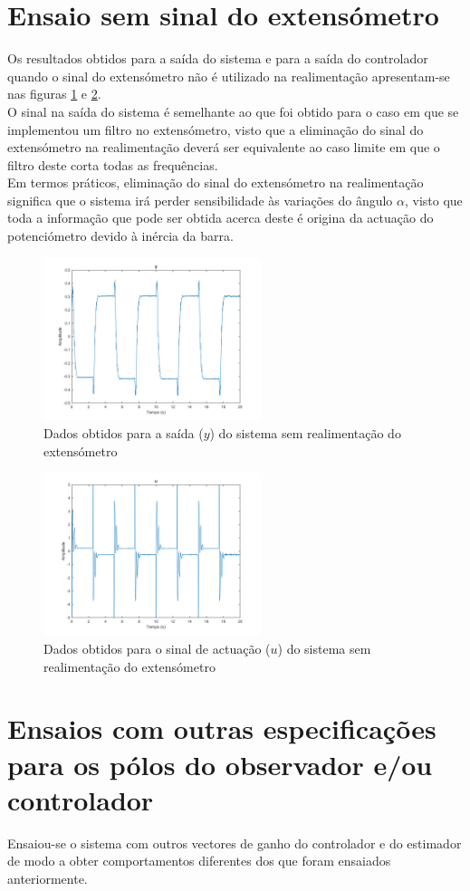 \documentclass[%
  reprint,
  nofootinbib,
  amsmath,amssymb,
  aps,
  10pt,
  a4paper
]{revtex4-1}
\begin{document}
\section{Ensaio sem sinal do extensómetro}
Os resultados obtidos para a saída do sistema e para a saída do controlador quando o sinal do extensómetro não é utilizado na realimentação apresentam-se nas figuras \ref{fig:y_next} e \ref{fig:u_next}.\\
O sinal na saída do sistema é semelhante ao que foi obtido para o caso em que se implementou um filtro no extensómetro, visto que a eliminação do sinal do extensómetro na realimentação deverá ser equivalente ao caso limite em que o filtro deste corta todas as frequências.\\
Em termos práticos, eliminação do sinal do extensómetro na realimentação significa que o sistema irá perder sensibilidade às variações do ângulo $\alpha$, visto que toda a informação que pode ser obtida acerca deste é origina da actuação do potenciómetro devido à inércia da barra.
\begin{figure}[H]
\includegraphics[width=2.5in]{../imgs/dados_0n/dados_0n_y.png}
\caption{Dados obtidos para a saída ($y$) do sistema sem realimentação do extensómetro}
\label{fig:y_next}
\end{figure}
\begin{figure}[H]
\includegraphics[width=2.5in]{../imgs/dados_0n/dados_0n_u.png}
\caption{Dados obtidos para o sinal de actuação ($u$) do sistema sem realimentação do extensómetro}
\label{fig:u_next}
\end{figure}
\section{Ensaios com outras especificações para os pólos do observador e/ou controlador}
Ensaiou-se o sistema com outros vectores de ganho do controlador e do estimador de modo a obter comportamentos diferentes dos que foram ensaiados anteriormente.\\
\end{document}
